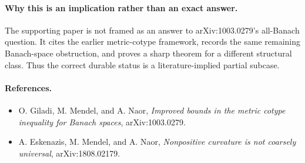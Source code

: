 \documentclass[11pt]{article}
\begin{document}
\paragraph{Why this is an implication rather than an exact answer.}
The supporting paper is not framed as an answer to arXiv:1003.0279's all-Banach
question.  It cites the earlier metric-cotype framework, records the same
remaining Banach-space obstruction, and proves a sharp theorem for a different
structural class.  Thus the correct durable status is a literature-implied
partial subcase.

\paragraph{References.}
\begin{itemize}
\item O. Giladi, M. Mendel, and A. Naor, \emph{Improved bounds in the metric cotype inequality for Banach spaces}, arXiv:1003.0279.
\item A. Eskenazis, M. Mendel, and A. Naor, \emph{Nonpositive curvature is not coarsely universal}, arXiv:1808.02179.
\end{itemize}
\end{document}
